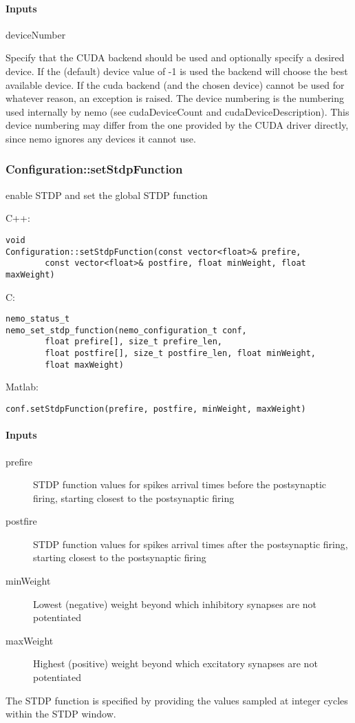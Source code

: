 \paragraph{Inputs}
\begin{description}
\item[deviceNumber]
\end{description}
Specify that the CUDA backend should be used and optionally specify a desired device. If the (default) device value of -1 is used the backend will choose the best available device.   If the cuda backend (and the chosen device) cannot be used for  whatever reason, an exception is raised.   The device numbering is the numbering used internally by nemo (see  cudaDeviceCount and cudaDeviceDescription). This device  numbering may differ from the one provided by the CUDA driver  directly, since nemo ignores any devices it cannot use. 

\clearpage
\subsubsection*{Configuration::setStdpFunction}
\label{fn: setStdpFunction}
enable STDP and set the global STDP function


\noindent C++:
\begin{lstlisting}[aboveskip=2pt]
void
Configuration::setStdpFunction(const vector<float>& prefire, 
        const vector<float>& postfire, float minWeight, float maxWeight)
\end{lstlisting}

\noindent C:
\begin{lstlisting}[aboveskip=2pt]
nemo_status_t
nemo_set_stdp_function(nemo_configuration_t conf, 
        float prefire[], size_t prefire_len, 
        float postfire[], size_t postfire_len, float minWeight, 
        float maxWeight)
\end{lstlisting}

\noindent Matlab:
\begin{lstlisting}[aboveskip=2pt]
conf.setStdpFunction(prefire, postfire, minWeight, maxWeight)
\end{lstlisting}
\paragraph{Inputs}
\begin{description}
\item[prefire] STDP function values for spikes arrival times before the postsynaptic firing, starting closest to the postsynaptic firing
\item[postfire] STDP function values for spikes arrival times after the postsynaptic firing, starting closest to the postsynaptic firing
\item[minWeight] Lowest (negative) weight beyond which inhibitory synapses are not potentiated
\item[maxWeight] Highest (positive) weight beyond which excitatory synapses are not potentiated
\end{description}
The STDP function is specified by providing the values sampled at integer cycles within the STDP window.

